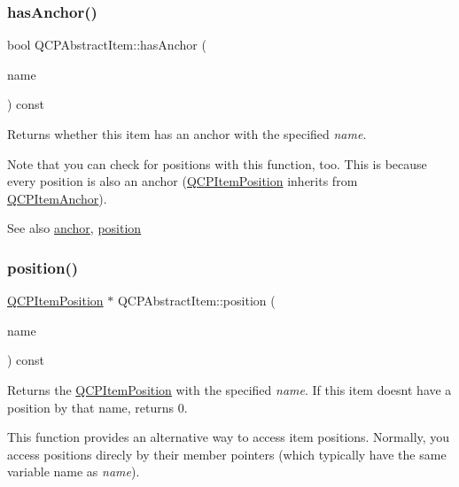 \subsubsection{\texorpdfstring{has\+Anchor()}{hasAnchor()}}
{\footnotesize\ttfamily bool Q\+C\+P\+Abstract\+Item\+::has\+Anchor (\begin{DoxyParamCaption}\item[{const Q\+String \&}]{name }\end{DoxyParamCaption}) const}

Returns whether this item has an anchor with the specified {\itshape name}.

Note that you can check for positions with this function, too. This is because every position is also an anchor (\mbox{\hyperlink{class_q_c_p_item_position}{Q\+C\+P\+Item\+Position}} inherits from \mbox{\hyperlink{class_q_c_p_item_anchor}{Q\+C\+P\+Item\+Anchor}}).

\begin{DoxySeeAlso}{See also}
\mbox{\hyperlink{class_q_c_p_abstract_item_a139c255ea8831642fac91748e29a5adb}{anchor}}, \mbox{\hyperlink{class_q_c_p_abstract_item_a2589c3d298f9a576d77d9addb440a18d}{position}} 
\end{DoxySeeAlso}
\mbox{\label{class_q_c_p_abstract_item_a2589c3d298f9a576d77d9addb440a18d}} 
\subsubsection{\texorpdfstring{position()}{position()}}
{\footnotesize\ttfamily \mbox{\hyperlink{class_q_c_p_item_position}{Q\+C\+P\+Item\+Position}} $\ast$ Q\+C\+P\+Abstract\+Item\+::position (\begin{DoxyParamCaption}\item[{const Q\+String \&}]{name }\end{DoxyParamCaption}) const}

Returns the \mbox{\hyperlink{class_q_c_p_item_position}{Q\+C\+P\+Item\+Position}} with the specified {\itshape name}. If this item doesn\textquotesingle{}t have a position by that name, returns 0.

This function provides an alternative way to access item positions. Normally, you access positions direcly by their member pointers (which typically have the same variable name as {\itshape name}).

